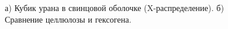 \documentclass[a4paper]{panl}
\begin{document}
\begin{figure}[t]
    \begin{center}
        \begin{minipage}[h]{0.49\linewidth}
        \end{minipage}
        \hfill
        \begin{minipage}[h]{0.49\linewidth}
        \end{minipage}
        \vspace{-3mm}
        \caption{а) Кубик урана в свинцовой оболочке (X-распределение). б) Сравнение целлюлозы и гексогена.}
    \end{center}
    \vspace{-5mm}
\end{figure}
\end{document}
